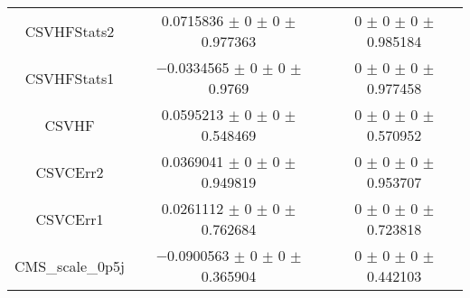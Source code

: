 \begin{table}
\begin{tabular}{ccc}
CSVHFStats2 & \num{0.0715836} $\pm$ \num{0} $\pm$ \num{0} $\pm$ \num{0.977363} & \num{0} $\pm$ \num{0} $\pm$ \num{0} $\pm$ \num{0.985184}\\
CSVHFStats1 & \num{-0.0334565} $\pm$ \num{0} $\pm$ \num{0} $\pm$ \num{0.9769} & \num{0} $\pm$ \num{0} $\pm$ \num{0} $\pm$ \num{0.977458}\\
CSVHF & \num{0.0595213} $\pm$ \num{0} $\pm$ \num{0} $\pm$ \num{0.548469} & \num{0} $\pm$ \num{0} $\pm$ \num{0} $\pm$ \num{0.570952}\\
CSVCErr2 & \num{0.0369041} $\pm$ \num{0} $\pm$ \num{0} $\pm$ \num{0.949819} & \num{0} $\pm$ \num{0} $\pm$ \num{0} $\pm$ \num{0.953707}\\
CSVCErr1 & \num{0.0261112} $\pm$ \num{0} $\pm$ \num{0} $\pm$ \num{0.762684} & \num{0} $\pm$ \num{0} $\pm$ \num{0} $\pm$ \num{0.723818}\\
CMS\_scale\_0p5j & \num{-0.0900563} $\pm$ \num{0} $\pm$ \num{0} $\pm$ \num{0.365904} & \num{0} $\pm$ \num{0} $\pm$ \num{0} $\pm$ \num{0.442103}\\
\bottomrule
\end{tabular}
\end{table}